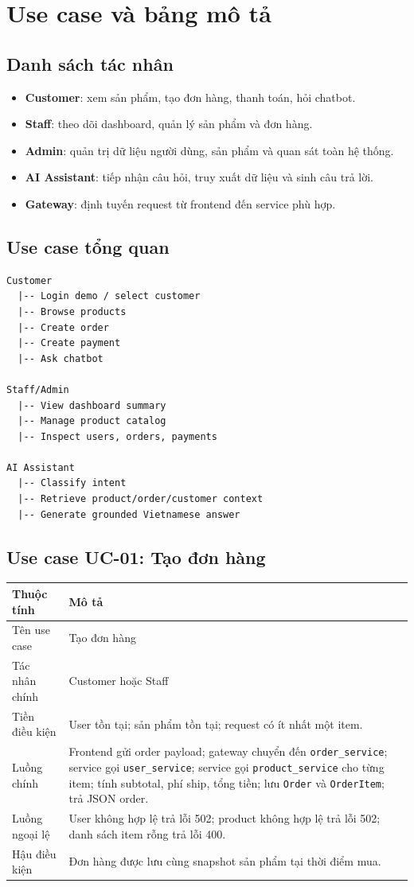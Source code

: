 \documentclass[12pt,a4paper]{report}
\begin{document}
\section{Use case và bảng mô tả}
\subsection{Danh sách tác nhân}
\begin{itemize}
  \item \textbf{Customer}: xem sản phẩm, tạo đơn hàng, thanh toán, hỏi chatbot.
  \item \textbf{Staff}: theo dõi dashboard, quản lý sản phẩm và đơn hàng.
  \item \textbf{Admin}: quản trị dữ liệu người dùng, sản phẩm và quan sát toàn hệ thống.
  \item \textbf{AI Assistant}: tiếp nhận câu hỏi, truy xuất dữ liệu và sinh câu trả lời.
  \item \textbf{Gateway}: định tuyến request từ frontend đến service phù hợp.
\end{itemize}

\subsection{Use case tổng quan}
\begin{lstlisting}[style=code,caption={Use case tổng quan hệ thống e-commerce}]
Customer
  |-- Login demo / select customer
  |-- Browse products
  |-- Create order
  |-- Create payment
  |-- Ask chatbot

Staff/Admin
  |-- View dashboard summary
  |-- Manage product catalog
  |-- Inspect users, orders, payments

AI Assistant
  |-- Classify intent
  |-- Retrieve product/order/customer context
  |-- Generate grounded Vietnamese answer
\end{lstlisting}

\subsection{Use case UC-01: Tạo đơn hàng}
\begin{longtable}{p{3.4cm}p{10cm}}
\toprule
\textbf{Thuộc tính} & \textbf{Mô tả} \\
\midrule
Tên use case & Tạo đơn hàng \\
Tác nhân chính & Customer hoặc Staff \\
Tiền điều kiện & User tồn tại; sản phẩm tồn tại; request có ít nhất một item. \\
Luồng chính & Frontend gửi order payload; gateway chuyển đến \texttt{order\_service}; service gọi \texttt{user\_service}; service gọi \texttt{product\_service} cho từng item; tính subtotal, phí ship, tổng tiền; lưu \texttt{Order} và \texttt{OrderItem}; trả JSON order. \\
Luồng ngoại lệ & User không hợp lệ trả lỗi 502; product không hợp lệ trả lỗi 502; danh sách item rỗng trả lỗi 400. \\
Hậu điều kiện & Đơn hàng được lưu cùng snapshot sản phẩm tại thời điểm mua. \\
\bottomrule
\end{longtable}
\end{document}

